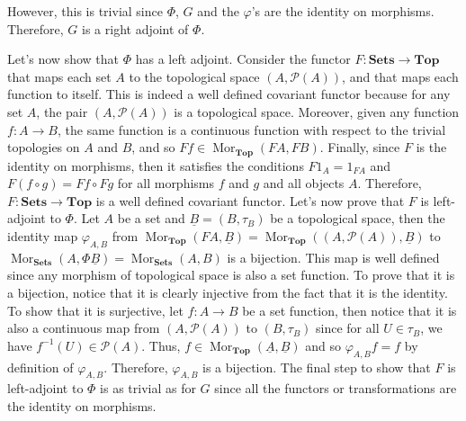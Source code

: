 \documentclass{article}
\newcommand{\CatTop}{\textbf{Top}}
\newcommand{\CatSets}{\textbf{Sets}}
\DeclareMathOperator{\Mor}{Mor}
\begin{document}
\begin{enumerate}[label=(\alph*)]
    \begin{center}
    \end{center}
    However, this is trivial since $\Phi$, $G$ and the $\varphi$'s are the identity on morphisms. Therefore, $G$ is a right adjoint of $\Phi$.

    Let's now show that $\Phi$ has a left adjoint. Consider the functor $F : \CatSets \to \CatTop$ that maps each set $A$ to the topological space $(A, \mathcal{P}(A))$, and that maps each function to itself. This is indeed a well defined covariant functor because for any set $A$, the pair $(A, \mathcal{P}(A))$ is a topological space. Moreover, given any function $f : A \to B$, the same function is a continuous function with respect to the trivial topologies on $A$ and $B$, and so $Ff \in \Mor_{\CatTop}(FA, FB)$. Finally, since $F$ is the identity on morphisms, then it satisfies the conditions $F1_A = 1_{FA}$ and $F(f \circ g) = Ff \circ Fg$ for all morphisms $f$ and $g$ and all objects $A$. Therefore, $F : \CatSets \to \CatTop$ is a well defined covariant functor. Let's now prove that $F$ is left-adjoint to $\Phi$. Let $A$ be a set and $\underline{B} = (B, \tau_B)$ be a topological space, then the identity map $\varphi_{A,B}$ from $\Mor_{\CatTop}(FA, \underline{B}) = \Mor_{\CatTop}((A, \mathcal{P}(A)), \underline{B})$ to $\Mor_{\CatSets}(A, \Phi \underline{B}) = \Mor_{\CatSets}(A,B)$ is a bijection. This map is well defined since any morphism of topological space is also a set function. To prove that it is a bijection, notice that it is clearly injective from the fact that it is the identity. To show that it is surjective, let $f : A \to B$ be a set function, then notice that it is also a continuous map from $(A, \mathcal{P}(A))$ to $(B, \tau_B)$ since for all $U \in \tau_B$, we have $f^{-1}(U) \in \mathcal{P}(A)$. Thus, $f \in \Mor_{\CatTop}(\underline{A}, \underline{B})$ and so $\varphi_{A,B}f = f$ by definition of $\varphi_{A,B}$. Therefore, $\varphi_{A,B}$ is a bijection. The final step to show that $F$ is left-adjoint to $\Phi$ is as trivial as for $G$ since all the functors or transformations are the identity on morphisms. 


\end{enumerate}
\end{document}
